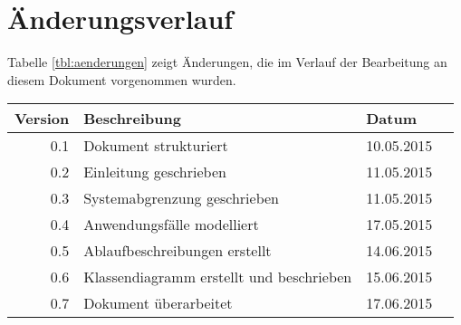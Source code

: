 \section*{Änderungsverlauf}

Tabelle \ref{tbl:aenderungen} zeigt Änderungen, die im Verlauf der Bearbeitung
an diesem Dokument vorgenommen wurden.
\\[\intextsep]
\begin{minipage}{\linewidth}
	\centering
	\begin{tabular}{rlll}
		\hline
		Version & Beschreibung                                  & Datum       \\
		\hline
		0.1     & Dokument strukturiert                         & 10.05.2015  \\
		0.2     & Einleitung geschrieben                        & 11.05.2015  \\
		0.3     & Systemabgrenzung geschrieben                  & 11.05.2015  \\
		0.4     & Anwendungsfälle modelliert                    & 17.05.2015  \\
		0.5     & Ablaufbeschreibungen erstellt                 & 14.06.2015  \\
		0.6     & Klassendiagramm erstellt und beschrieben      & 15.06.2015  \\
		0.7     & Dokument überarbeitet                         & 17.06.2015  \\
		\hline
	\end{tabular}
	\label{tbl:aenderungen}
\end{minipage}

